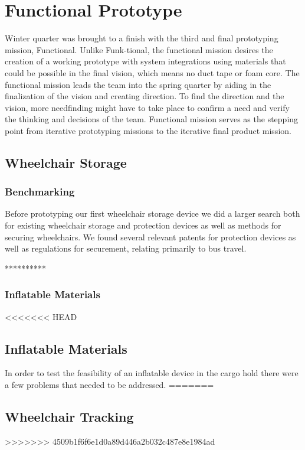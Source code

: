 \section{Functional Prototype}
Winter quarter was brought to a finish with the third and final prototyping mission, Functional.  Unlike Funk-tional, the functional mission desires the creation of a working prototype with system integrations using materials that could be possible in the final vision, which means no duct tape or foam core. The functional mission leads the team into the spring quarter by aiding in the finalization of the vision and creating direction.  To find the direction and the vision, more needfinding might have to take place to confirm a need and verify the thinking and decisions of the team. Functional mission serves as the stepping point from iterative prototyping missions to the iterative final product mission.

\subsection{Wheelchair Storage}

\subsubsection{Benchmarking}
Before prototyping our first wheelchair storage device we did a larger search both for existing wheelchair storage and protection devices as well as methods for securing wheelchairs. We found several relevant patents for protection devices as well as regulations for securement, relating primarily to bus travel.

**********


\subsubsection{Inflatable Materials}

<<<<<<< HEAD
\subsection{Inflatable Materials}
In order to test the feasibility of an inflatable device in the cargo hold there were a few problems that needed to be addressed. 
=======
\subsection{Wheelchair Tracking}
>>>>>>> 4509b1f6f6e1d0a89d446a2b032c487e8e1984ad

